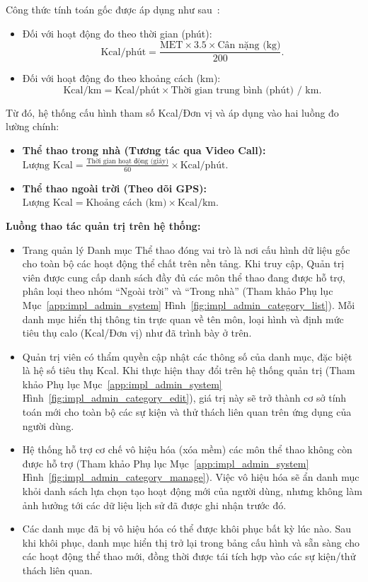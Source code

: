 Công thức tính toán gốc được áp dụng như sau~\cite{NASM_MET}:
\begin{itemize}
    \item Đối với hoạt động đo theo thời gian (phút):
    \[
        \text{Kcal/phút} = \frac{\text{MET} \times 3.5 \times \text{Cân nặng (kg)}}{200}.
    \]
    \item Đối với hoạt động đo theo khoảng cách (km):
    \[
        \text{Kcal/km} = \text{Kcal/phút} \times \text{Thời gian trung bình (phút) / km}.
    \]
\end{itemize}

Từ đó, hệ thống cấu hình tham số Kcal/Đơn vị và áp dụng vào hai luồng đo lường chính:
\begin{itemize}
    \item \textbf{Thể thao trong nhà (Tương tác qua Video Call):} $\text{Lượng Kcal} = \frac{\text{Thời gian hoạt động (giây)}}{60} \times \text{Kcal/phút}$.
    \item \textbf{Thể thao ngoài trời (Theo dõi GPS):} $\text{Lượng Kcal} = \text{Khoảng cách (km)} \times \text{Kcal/km}$.
\end{itemize}

\textbf{Luồng thao tác quản trị trên hệ thống:}
\begin{itemize}
    \item Trang quản lý Danh mục Thể thao đóng vai trò là nơi cấu hình dữ liệu gốc cho toàn bộ các hoạt động thể chất trên nền tảng. Khi truy cập, Quản trị viên được cung cấp danh sách đầy đủ các môn thể thao đang được hỗ trợ, phân loại theo nhóm ``Ngoài trời'' và ``Trong nhà'' (Tham khảo Phụ lục Mục~\ref{app:impl_admin_system} Hình~\ref{fig:impl_admin_category_list}). Mỗi danh mục hiển thị thông tin trực quan về tên môn, loại hình và định mức tiêu thụ calo (Kcal/Đơn vị) như đã trình bày ở trên.


    \item Quản trị viên có thẩm quyền cập nhật các thông số của danh mục, đặc biệt là hệ số tiêu thụ Kcal. Khi thực hiện thay đổi trên hệ thống quản trị (Tham khảo Phụ lục Mục~\ref{app:impl_admin_system} Hình~\ref{fig:impl_admin_category_edit}), giá trị này sẽ trở thành cơ sở tính toán mới cho toàn bộ các sự kiện và thử thách liên quan trên ứng dụng của người dùng.


    \item Hệ thống hỗ trợ cơ chế vô hiệu hóa (xóa mềm) các môn thể thao không còn được hỗ trợ (Tham khảo Phụ lục Mục~\ref{app:impl_admin_system} Hình~\ref{fig:impl_admin_category_manage}). Việc vô hiệu hóa sẽ ẩn danh mục khỏi danh sách lựa chọn tạo hoạt động mới của người dùng, nhưng không làm ảnh hưởng tới các dữ liệu lịch sử đã được ghi nhận trước đó.


    \item Các danh mục đã bị vô hiệu hóa có thể được khôi phục bất kỳ lúc nào. Sau khi khôi phục, danh mục hiển thị trở lại trong bảng cấu hình và sẵn sàng cho các hoạt động thể thao mới, đồng thời được tái tích hợp vào các sự kiện/thử thách liên quan.

\end{itemize}

